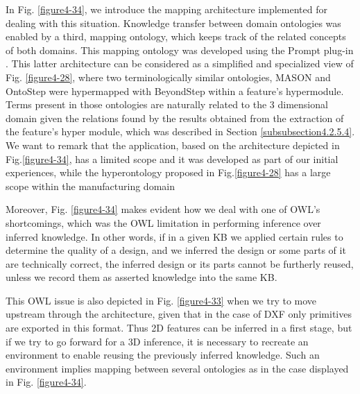 In Fig. \ref{figure4-34}, we introduce the mapping architecture implemented for dealing with this situation. Knowledge transfer between domain ontologies was enabled by a third, mapping ontology, which keeps track of the related concepts of both domains. This mapping ontology was developed using the Prompt plug-in \citep{noy_prompt_2003}. This latter architecture can be considered as a simplified and specialized view of Fig. \ref{figure4-28}, where two terminologically similar ontologies, MASON and OntoStep were hypermapped with BeyondStep within a feature’s hypermodule. Terms present in those ontologies are naturally related to the 3 dimensional domain given the relations found by the results obtained from the extraction of the feature’s hyper module, which was described in Section \ref{subsubsection4.2.5.4}. \cbstart We want to remark that the application, based on the architecture depicted in Fig.\ref{figure4-34}, has a limited scope and it was developed as part of our initial experiences, while the hyperontology proposed in Fig.\ref{figure4-28} has a large scope within the manufacturing domain\cbend 

Moreover, Fig. \ref{figure4-34} makes evident how we deal with one of OWL’s shortcomings, which was the OWL limitation in performing inference over inferred knowledge. In other words, if in a given KB we applied certain rules to determine the quality of a design, and we inferred the design or some parts of it are technically correct, the inferred design or its parts cannot be furtherly reused, unless we record them as asserted knowledge into the same KB. 

This OWL issue is also depicted in Fig. \ref{figure4-33} when we try to move upstream through the architecture, given that in the case of DXF only primitives are exported in this format. Thus 2D features can be inferred in a first stage, but if we try to go forward for a 3D inference, it is necessary to recreate an environment to enable reusing the previously inferred knowledge. Such an environment implies mapping between  several ontologies as in the case displayed in Fig. \ref{figure4-34}. 


